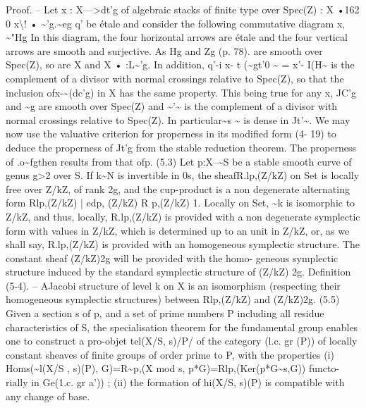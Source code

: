 \documentclass[11pt]{article}
\theoremstyle{plain}
\theoremstyle{definition}
\theoremstyle{remark}
\begin{document}
Proof. -- Let x : X--->dt'g of algebraic stacks of finite type over Spec(Z) : X •162 0 x\textbackslash{}! • \textasciitilde{}'g.\textasciitilde{}eg q' be étale and consider the following commutative diagram x, \textasciitilde{}"Hg In this diagram, the four horizontal arrows are étale and the four vertical arrows are smooth and surjective. As Hg and Zg (p. 78). are smooth over Spec(Z), so are X and X • :L\textasciitilde{}'g. In addition, q'-i x- t (\textasciitilde{}gt'0 \textasciitilde{} = x'- I(H\textasciitilde{} is the complement of a divisor with normal crossings relative to Spec(Z), so that the inclusion ofx-\textasciitilde{}(dc'g) in X has the same property. This being true for any x, JC'g and \textasciitilde{}g are smooth over Spec(Z) and \textasciitilde{}'\textasciitilde{} is the complement of a divisor with normal crossings relative to Spec(Z). In particular\textasciitilde{}s \textasciitilde{} is dense in Jt'\textasciitilde{}. We may now use the valuative criterion for properness in its modified form (4- 19) to deduce the properness of Jt'g from the stable reduction theorem. The properness of .o\textasciitilde{}fgthen results from that ofp. (5.3) Let p:X--\textasciitilde{}S be a stable smooth curve of genus g>2 over S. If k\textasciitilde{}N is invertible in 0s, the sheafR.lp,(Z/kZ) on Set is locally free over Z/kZ, of rank 2g, and the cup-product is a non degenerate alternating form Rlp,(Z/kZ) | edp, (Z/kZ) R p,(Z/kZ) 1. Locally on Set, \textasciitilde{}k is isomorphic to Z/kZ, and thus, locally, R.lp,(Z/kZ) is provided with a non degenerate symplectic form with values in Z/kZ, which is determined up to an unit in Z/kZ, or, as we shall say, R.lp,(Z/kZ) is provided with an homogeneous symplectic structure. The constant sheaf (Z/kZ)2g will be provided with the homo- geneous symplectic structure induced by the standard symplectic structure of (Z/kZ) 2g. Definition (5-4). -- AJacobi structure of level k on X is an isomorphism (respecting their homogeneous symplectic structures) between Rlp,(Z/kZ) and (Z/kZ)2g. (5.5) Given a section s of p, and a set of prime numbers P including all residue characteristics of S, the specialisation theorem for the fundamental group enables one to construct a pro-objet tel(X/S, s)/P/ of the category (l.c. gr (P)) of locally constant sheaves of finite groups of order prime to P, with the properties (i) Homs(\textasciitilde{}l(X/S , s)(P), G)=R\textasciitilde{}p,(X mod s, p*G)=Rlp,(Ker(p*G\textasciitilde{}s,G)) functo- rially in Ge(1.c. gr a')) ; (ii) the formation of hi(X/S, s)(P) is compatible with any change of base.
\end{document}
